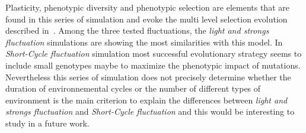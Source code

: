 Plasticity, phenotypic diversity and phenotypic selection are elements that are found in this series of simulation and evoke the  multi level selection evolution described in~\citep{jablonka2014evolution}. Among the three tested fluctuations, the \emph{light and strongs fluctuation} simulations are showing the most similarities with this model. In \emph{Short-Cycle fluctuation} simulation most successful evolutionary strategy seems to include small genotypes maybe to maximize the phenotypic impact of mutations. Nevertheless this series of simulation does not precisely determine whether the duration of environnemental cycles or the number of different types of environment is the main criterion to explain the differences between \emph{light and strongs fluctuation} and \emph{Short-Cycle fluctuation} and this would be interesting to study in a future work.